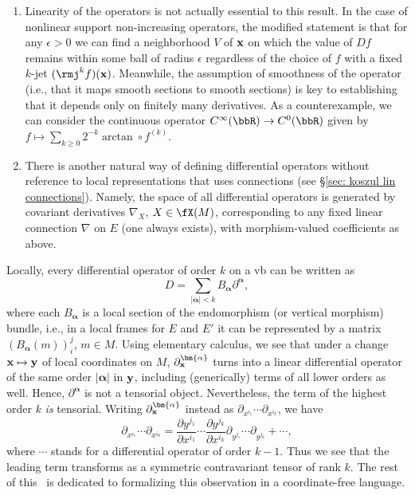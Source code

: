 \begin{rem}
    \begin{enumerate}
        \item Linearity of the operators is not actually essential to this result. In the case of nonlinear support non-increasing operators, the modified statement is that for any $\epsilon>0$ we can find a neighborhood $V$ of $\bf{x}$ on which the value of $Df$ remains within some ball of radius $\epsilon$ regardless of the choice of $f$ with a fixed $k$-jet $(\rmj^kf)(\bf{x})$. Meanwhile, the assumption of smoothness of the operator (i.e., that it maps smooth sections to smooth sections) is key to establishing that it depends only on finitely many derivatives. As a counterexample, we can consider the continuous operator $C^\infty(\bbR)\to C^0(\bbR)$ given by $f\mapsto \sum_{k\geq 0} 2^{-k}\arctan\circ f^{(k)}$.
        \item There is another natural way of defining differential operators without reference to local representations that uses connections (see \S\ref{sec: koszul lin connections}). Namely, the space of all differential operators is generated by covariant derivatives $\nabla_X$, $X\in\fX(M)$, corresponding to any fixed linear connection $\nabla$ on $E$ (one always exists), with morphism-valued coefficients as above.
    \end{enumerate}
\end{rem}

Locally, every differential operator of order $k$ on a \gls{vb} can be written as 
\[D=\sum_{|\bm{\alpha}|<k}B_{\bm{\alpha}}\partial^{\bm{\alpha}},\]
where each $B_{\bm{\alpha}}$ is a local section of the endomorphism (or vertical morphism) bundle, i.e., in a local frames for $E$ and $E'$ it can be represented by a matrix $(B_{\bm{\alpha}}(m))_i^j$, $m\in M$. Using elementary calculus,  we see that under a change $\bf{x}\mapsto \bf{y}$ of local coordinates on $M$, $\partial^{\bm{\alpha}}_{\bf{x}}$ turns into a linear differential operator of the same order $|\bm{\alpha}|$ in $\bf{y}$, including (generically) terms of all lower orders as well. Hence, $\partial^{\bm{\alpha}}$ is not a tensorial object. Nevertheless, the term of the highest order $k$ \emph{is} tensorial. Writing $\partial^{\bm{\alpha}}_{\bf{x}}$ instead as $\partial_{x^{i_1}}\cdots \partial_{x^{i_k}}$, we have 
\[\partial_{x^{i_1}}\cdots \partial_{x^{i_k}}=\frac{\partial y^{j_1}}{\partial x^{i_1}}\cdots \frac{\partial y^{j_k}}{\partial x^{i_k}}\partial_{y^{j_1}}\cdots \partial_{y^{j_k}}+\cdots ,\]
where $\cdots$ stands for a differential operator of order $k-1$. Thus we see that the leading term transforms as a symmetric contravariant tensor of rank $k$. The rest of this \sect\ is dedicated to formalizing this observation in a coordinate-free language.

